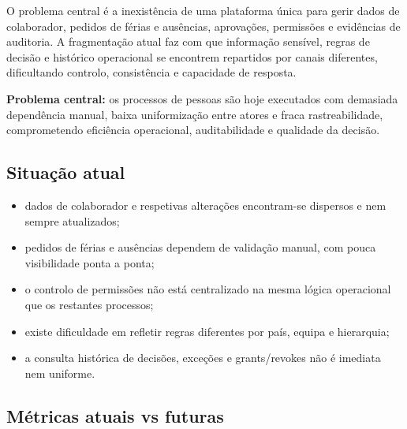 \documentclass[11pt,a4paper,twoside]{article}
\begin{document}
O problema central é a inexistência de uma plataforma única para gerir dados de colaborador, pedidos de férias e ausências, aprovações, permissões e evidências de auditoria. A fragmentação atual faz com que informação sensível, regras de decisão e histórico operacional se encontrem repartidos por canais diferentes, dificultando controlo, consistência e capacidade de resposta.

\begin{callout}
\textbf{Problema central:} os processos de pessoas são hoje executados com demasiada dependência manual, baixa uniformização entre atores e fraca rastreabilidade, comprometendo eficiência operacional, auditabilidade e qualidade da decisão.
\end{callout}

\subsection{Situação atual}

\begin{itemize}
  \item dados de colaborador e respetivas alterações encontram-se dispersos e nem sempre atualizados;
  \item pedidos de férias e ausências dependem de validação manual, com pouca visibilidade ponta a ponta;
  \item o controlo de permissões não está centralizado na mesma lógica operacional que os restantes processos;
  \item existe dificuldade em refletir regras diferentes por país, equipa e hierarquia;
  \item a consulta histórica de decisões, exceções e grants/revokes não é imediata nem uniforme.
\end{itemize}

\subsection{Métricas atuais vs futuras}
\end{document}
